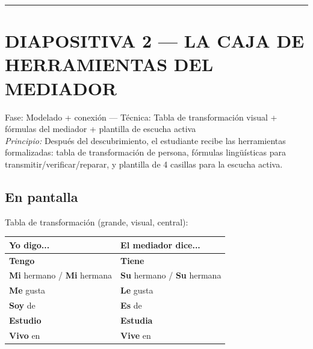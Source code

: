 \documentclass[a4paper,11pt]{article}
\begin{document}
\newpage


\noindent\textcolor{violeta}{\rule{\linewidth}{2.5pt}}

\section*{DIAPOSITIVA 2 — LA CAJA DE HERRAMIENTAS DEL MEDIADOR}

{\small Fase: Modelado + conexión — Técnica: Tabla de transformación visual + fórmulas del mediador + plantilla de escucha activa}\\
{\small\textit{Principio:} Después del descubrimiento, el estudiante recibe las herramientas formalizadas: tabla de transformación de persona, fórmulas lingüísticas para transmitir/verificar/reparar, y plantilla de 4 casillas para la escucha activa.}

\vspace{0.5cm}

\subsection*{En pantalla}

Tabla de transformación (grande, visual, central):

\begin{center}
\renewcommand{\arraystretch}{1.5}
\begin{tabular}{|>{\centering\arraybackslash}p{5.5cm}|>{\centering\arraybackslash}p{5.5cm}|}
\hline
\rowcolor{rojog!15}
\textbf{Yo digo...} & \cellcolor{verde!15}\textbf{El mediador dice...} \\
\hline
\textbf{\textcolor{rojog}{Tengo}} & \textbf{\textcolor{verde}{Tiene}} \\
\hline
\textbf{\textcolor{rojog}{Mi}} hermano / \textbf{\textcolor{rojog}{Mi}} hermana & \textbf{\textcolor{verde}{Su}} hermano / \textbf{\textcolor{verde}{Su}} hermana \\
\hline
\textbf{\textcolor{rojog}{Me}} gusta & \textbf{\textcolor{verde}{Le}} gusta \\
\hline
\textbf{\textcolor{rojog}{Soy}} de & \textbf{\textcolor{verde}{Es}} de \\
\hline
\textbf{\textcolor{rojog}{Estudio}} & \textbf{\textcolor{verde}{Estudia}} \\
\hline
\textbf{\textcolor{rojog}{Vivo}} en & \textbf{\textcolor{verde}{Vive}} en \\
\hline
\end{tabular}
\end{center}
\end{document}
